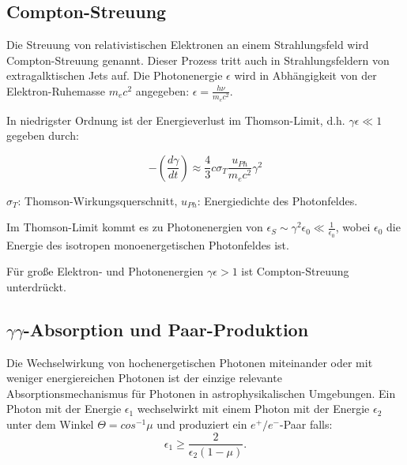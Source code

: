 \subsection{Compton-Streuung}
Die Streuung von relativistischen Elektronen an einem Strahlungsfeld wird Compton-Streuung genannt.
Dieser Prozess tritt auch in Strahlungsfeldern von extragalktischen Jets auf.
Die Photonenergie $\epsilon$ wird in Abhängigkeit von der Elektron-Ruhemasse $m_e c^2$ angegeben: $\epsilon= \frac{h\nu}{m_e c^2}$. \cite{RelativisticJets}
 
In niedrigster Ordnung ist der Energieverlust im Thomson-Limit, d.h. $\gamma \epsilon \ll 1$ gegeben durch:

\begin{equation}
-\left(\frac{d\gamma}{dt} \right) \approx \frac{4}{3} c \sigma_T \frac{u_{Ph}}{m_e c^2} \gamma^2
\end{equation}

\begin{center}
 \begin{small}
  $\sigma_T$: Thomson-Wirkungsquerschnitt, $u_{Ph}$: Energiedichte des Photonfeldes.
 \end{small}
\end{center}

Im Thomson-Limit kommt es zu Photonenergien von $\epsilon_S \sim \gamma^2 \epsilon_0 \ll \frac{1}{\epsilon_0} $, wobei $\epsilon_0$ die Energie des isotropen monoenergetischen Photonfeldes ist.\cite{RelativisticJets}

Für große Elektron- und Photonenergien $\gamma \epsilon > 1$ ist Compton-Streuung unterdrückt.\cite{RelativisticJets}


\subsection{$\gamma\gamma$-Absorption und Paar-Produktion}
Die Wechselwirkung von hochenergetischen Photonen miteinander oder mit weniger energiereichen Photonen ist der einzige relevante Absorptionsmechanismus für Photonen in astrophysikalischen Umgebungen.
Ein Photon mit der Energie $\epsilon_1$ wechselwirkt mit einem Photon mit der Energie $\epsilon_2$ unter dem Winkel $\Theta=cos^{-1}\mu$ und produziert ein $e^+/e^-$-Paar falls:
\begin{equation}
 \epsilon_1 \geq \frac{2}{\epsilon_2 (1-\mu)}.
\end{equation}

